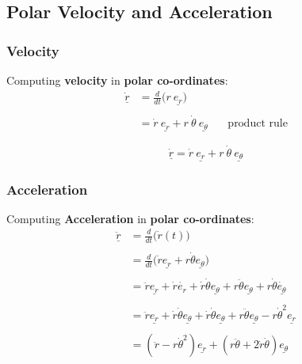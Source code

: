 \subsection{Polar Velocity and Acceleration}

\subsubsection{Velocity}
Computing {\bf velocity} in {\bf polar co-ordinates}:
$$\begin{aligned} \dot{\underline{r}} & = \frac{d}{dt}\Big(r \ \underline{e_{r}}\Big)                                                              \\ \\
                                    & = \dot{r}\ \underline{e_{r}} + r\ \dot{\theta}\ \underline{e_{\theta}} \ \ \ \ \ \ \ \ \text{product rule}\end{aligned}$$

\begin{definition}
	\begin{equation}
		\label{eq: velocity-polar}
		\underline{\dot{r}} = \dot{r}\ \underline{e_{r}} + r\ \dot{\theta}\ \underline{e_{\theta}}
	\end{equation}
\end{definition}

\subsubsection{Acceleration}
Computing {\bf Acceleration} in {\bf polar co-ordinates}:
$$\begin{aligned} \underline{\ddot{r}} & = \frac{d}{dt}\Big(\dot{r}(t)\Big)                                                                                                                                                              \\ \\
                                     & = \frac{d}{dt}\Big(\dot{r}\underline{e_{r}} + r\dot{\theta}\underline{e_{\theta}} \Big)                                                                                                         \\ \\
                                     & = \ddot{r}\underline{e_{r}}+ \dot{r}\dot{e_{r}}+ \dot{r}\dot{\theta}\underline{e_{\theta}} + r\ddot{\theta}\underline{e_{\theta}} + r\dot{\theta}\underline{\dot{e_{\theta}}}                   \\ \\
                                     & = \ddot{r}\underline{e_{r}} + \dot{r}\dot{\theta}\underline{e_{\theta}} + \dot{r}\dot{\theta}\underline{e_{\theta}} + r\ddot{\theta}\underline{e_{\theta}} - r\dot{\theta}^{2}\underline{e_{r}} \\ \\
                                     & = (\ddot{r} - r\dot{\theta}^{2})\underline{e_{r}} + (r\ddot{\theta} + 2\dot{r}\dot{\theta})\underline{e_{\theta}}\end{aligned}$$

